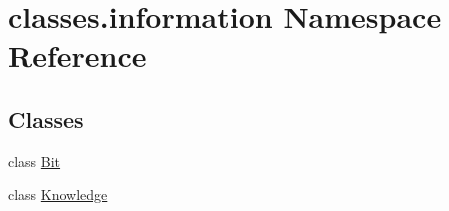 \hypertarget{namespaceclasses_1_1information}{}\section{classes.\+information Namespace Reference}
\label{namespaceclasses_1_1information}
\subsection*{Classes}
\begin{DoxyCompactItemize}
\item 
class \hyperlink{classclasses_1_1information_1_1Bit}{Bit}
\item 
class \hyperlink{classclasses_1_1information_1_1Knowledge}{Knowledge}
\end{DoxyCompactItemize}
